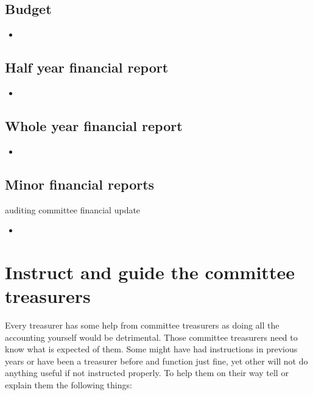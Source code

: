 \documentclass{report}
\begin{document}
\subsection{Budget}

\begin{itemize} 
\vspace{-1mm}
\itemsep-1mm 
\item 
\end{itemize}

\subsection{Half year financial report}

\begin{itemize} 
\vspace{-1mm}
\itemsep-1mm 
\item 
\end{itemize}

\subsection{Whole year financial report}

\begin{itemize} 
\vspace{-1mm}
\itemsep-1mm 
\item 
\end{itemize}

\subsection{Minor financial reports}
auditing committee
financial update
\begin{itemize} 
\vspace{-1mm}
\itemsep-1mm 
\item 
\end{itemize}

\section{Instruct and guide the committee treasurers}
Every treasurer has some help from committee treasurers as doing all the accounting yourself would be detrimental. Those committee treasurers need to know what is expected of them. Some might have had instructions in previous years or have been a treasurer before and function just fine, yet other will not do anything useful if not instructed properly. To help them on their way tell or explain them the following things:
\end{document}
